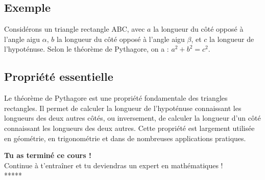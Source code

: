 \documentclass[12pt,a4paper]{article}
\begin{document}
\subsection*{Exemple}
Considérons un triangle rectangle ABC, avec $a$ la longueur du côté opposé à l'angle aigu $\alpha$, $b$ la longueur du côté opposé à l'angle aigu $\beta$, et $c$ la longueur de l'hypoténuse. Selon le théorème de Pythagore, on a : $a^2 + b^2 = c^2$.

\subsection*{Propriété essentielle}
Le théorème de Pythagore est une propriété fondamentale des triangles rectangles. Il permet de calculer la longueur de l'hypoténuse connaissant les longueurs des deux autres côtés, ou inversement, de calculer la longueur d'un côté connaissant les longueurs des deux autres. Cette propriété est largement utilisée en géométrie, en trigonométrie et dans de nombreuses applications pratiques.

\newpage
\begin{center}
\begin{tcolorbox}[colback=lightgray,colframe=success,title=\textbf{\textcolor{success}{Bravo !}}]
\Large\textbf{\textcolor{success}{Tu as terminé ce cours !}}\\[0.5cm]
\textcolor{secondary}{Continue à t'entraîner et tu deviendras un expert en mathématiques !}\\[0.5cm]
\textcolor{accent}{*****}
\end{tcolorbox}
\end{center}
\end{document}
